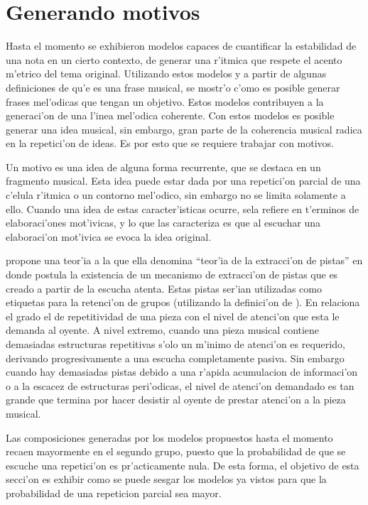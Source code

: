 \section{Generando motivos}
Hasta el momento se exhibieron modelos capaces de cuantificar la estabilidad de una nota en un cierto contexto, de generar una r'itmica que
respete el acento m'etrico del tema original. Utilizando estos modelos y a partir de algunas definiciones de qu'e es una frase musical, se mostr'o c'omo es posible
generar frases mel'odicas que tengan un objetivo. Estos modelos contribuyen a la generaci'on de una l'inea mel'odica coherente. Con estos modelos es posible
generar una idea musical, sin embargo, gran parte de la coherencia musical radica en la repetici'on de ideas. Es por esto que se requiere trabajar con motivos. 

Un motivo es una idea de alguna forma recurrente, que se destaca en un fragmento musical. Esta idea puede estar dada por una repetici'on parcial de una c'elula 
r'itmica o un contorno mel'odico, sin embargo no se limita solamente a ello. Cuando una idea de estas caracter'isticas ocurre, sela refiere en t'erminos
de elaboraci'ones mot'ivicas, y lo que las caracteriza es que al escuchar una elaboraci'on mot'ivica se evoca la idea original.

\cite{Deliege87} propone una teor'ia a la que ella denomina ``teor'ia de la extracci'on de pistas'' en donde postula la existencia de un mecanismo de 
extracci'on de pistas 
que es creado a partir de la escucha atenta. Estas pistas ser'ian utilizadas como etiquetas para la retenci'on de grupos (utilizando la definici'on de 
\cite{LerdahlJackendoff83}). En \cite{Deliege90} relaciona el grado el
de repetitividad de una pieza con el nivel de atenci'on que esta le demanda al oyente. A nivel extremo, cuando una pieza musical contiene demasiadas estructuras 
repetitivas s'olo un m'inimo de atenci'on es requerido, derivando progresivamente a una escucha completamente pasiva. Sin embargo cuando hay demasiadas 
pistas debido a una r'apida acumulacion de informaci'on o a la escacez de estructuras peri'odicas, el nivel de atenci'on demandado es tan grande que 
termina por hacer desistir al oyente de prestar atenci'on a la pieza musical.

Las composiciones generadas por los modelos propuestos hasta el momento recaen mayormente en el segundo grupo, puesto que la probabilidad de que se escuche
una repetici'on es pr'acticamente nula. De esta forma, el objetivo de esta secci'on es exhibir como se puede sesgar los modelos ya vistos para que 
la probabilidad de una repeticion parcial sea mayor. 



